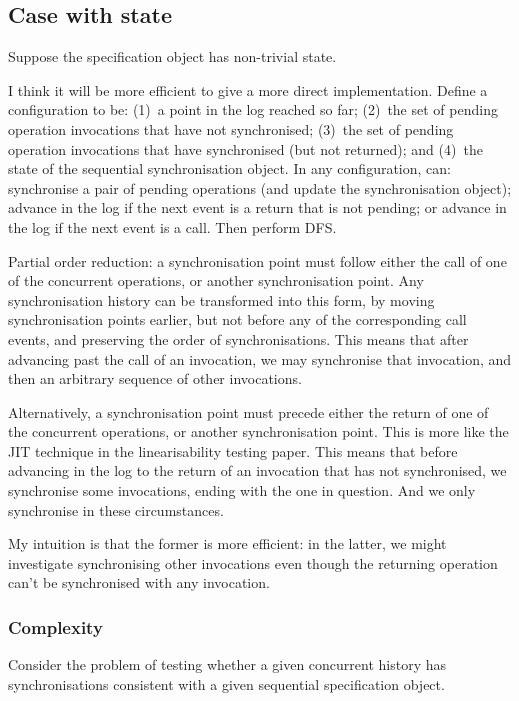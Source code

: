 
\subsection{Case with state}

Suppose the specification object has non-trivial state. 

I think it will be more efficient to give a more direct implementation.
Define a configuration to be: (1)~a point in the log reached so far; (2)~the
set of pending operation invocations that have not synchronised; (3)~the set
of pending operation invocations that have synchronised (but not returned);
and (4)~the state of the sequential synchronisation object.  In any
configuration, can: synchronise a pair of pending operations (and update the
synchronisation object); advance in the log if the next event is a return that
is not pending; or advance in the log if the next event is a call.  Then
perform DFS.

Partial order reduction: a synchronisation point must follow either the
call of one of the concurrent operations, or another synchronisation
point.  Any synchronisation history can be transformed into this form, by
moving synchronisation points earlier, but not before any of the corresponding
call events, and preserving the order of synchronisations.  This means that
after advancing past the call of an invocation, we may synchronise that
invocation, and then an arbitrary sequence of other invocations. 

Alternatively, a synchronisation point must precede either the return of one
of the concurrent operations, or another synchronisation point.  This is more
like the JIT technique in the linearisability testing paper.  This means that
before advancing in the log to the return of an invocation that has not
synchronised, we synchronise some invocations, ending with the one in
question.  And we only synchronise in these circumstances. 

My intuition is that the former is more efficient: in the latter, we might
investigate synchronising other invocations even though the returning
operation can't be synchronised with any invocation.  


\subsubsection*{Complexity}

Consider the problem of testing whether a given concurrent history has
synchronisations consistent with a given sequential specification object. 


